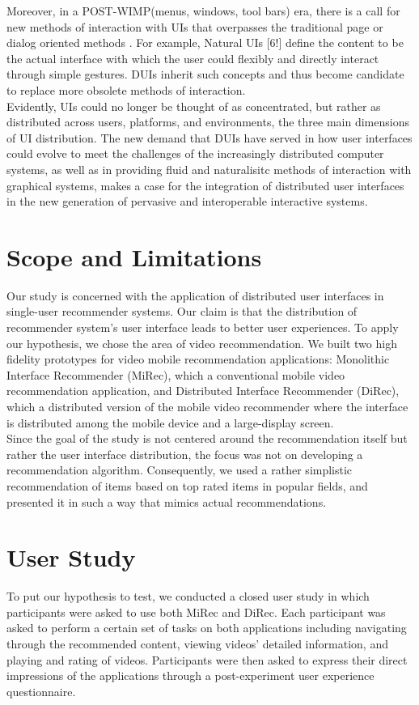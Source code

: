 Moreover, in a POST-WIMP(menus, windows, tool bars) era, there is a call for new
methods of interaction with UIs that overpasses the traditional page or dialog
oriented methods \cite{seifried2011lessons}. For example, Natural UIs [6!]
define the content to be the actual interface with which the user could flexibly and directly interact through simple gestures. DUIs inherit such
concepts and thus become candidate to replace more obsolete methods of
interaction.\\
Evidently, UIs could no longer be thought of as concentrated, but rather as
distributed across users, platforms, and environments, the three main dimensions
of UI distribution. The new demand that DUIs have served in how user interfaces
could evolve to meet the challenges of the increasingly distributed computer
systems, as well as in providing fluid and naturalisitc methods of interaction
with graphical systems, makes a case for the integration of distributed user
interfaces in the new generation of pervasive and interoperable interactive
systems.
\section{Scope and Limitations}
Our study is concerned with the application of distributed user interfaces in
single-user recommender systems. Our claim is that the distribution of
recommender system's user interface leads to better user experiences. To apply
our hypothesis, we chose the area of video recommendation. We built two high
fidelity prototypes for video mobile recommendation applications: Monolithic Interface Recommender (MiRec), which a conventional mobile video recommendation
application, and Distributed Interface Recommender (DiRec), which a distributed
version of the mobile video recommender where the interface is distributed among
the mobile device and a large-display screen.\\
Since the goal of the study is not centered around the recommendation itself but
rather the user interface distribution, the focus was not on developing a
recommendation algorithm. Consequently, we used a rather simplistic
recommendation of items based on top rated items in popular fields, and
presented it in such a way that mimics actual recommendations.

\section{User Study}
To put our hypothesis to test, we conducted a closed user study in which
participants were asked to use both MiRec and DiRec. Each
participant was asked to perform a certain set of tasks on both applications
including navigating through the recommended content, viewing videos' detailed
information, and playing and rating of videos. Participants were then asked to
express their direct impressions of the applications through a post-experiment
user experience questionnaire.

